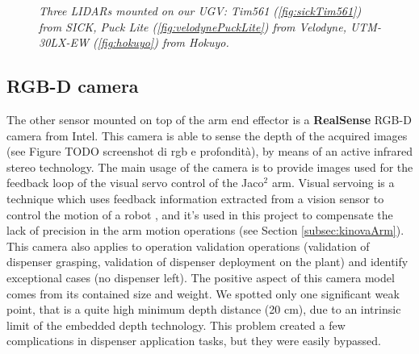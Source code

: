 \begin{figure}
	\centering
	\caption{\textit{Three \ac{LIDAR}s mounted on our \ac{UGV}: Tim561 (\ref{fig:sickTim561}) from SICK, Puck Lite (\ref{fig:velodynePuckLite}) from Velodyne, UTM-30LX-EW (\ref{fig:hokuyo}) from Hokuyo.}}
\end{figure}

\subsection{RGB-D camera}
The other sensor mounted on top of the arm end effector is a \textbf{RealSense} RGB-D camera from Intel. This camera is able to sense the depth of the acquired images (see Figure TODO screenshot di rgb e profondità), by means of an active infrared stereo technology. The main usage of the camera is to provide images used for the feedback loop of the visual servo control of the Jaco$^2$ arm. Visual servoing is a technique which uses feedback information extracted from a vision sensor to control the motion of a robot \parencite{visualServo}, and it's used in this project to compensate the lack of precision in the arm motion operations (see Section \ref{subsec:kinovaArm}). This camera also applies to operation validation operations (validation of dispenser grasping, validation of dispenser deployment on the plant) and identify exceptional cases (no dispenser left). The positive aspect of this camera model comes from its contained size and weight. We spotted only one significant weak point, that is a quite high minimum depth distance (20 cm), due to an intrinsic limit of the embedded depth technology. This problem created a few complications in dispenser application tasks, but they were easily bypassed.

